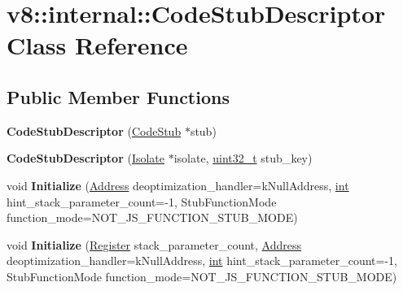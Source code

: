 \hypertarget{classv8_1_1internal_1_1CodeStubDescriptor}{}\section{v8\+:\+:internal\+:\+:Code\+Stub\+Descriptor Class Reference}
\label{classv8_1_1internal_1_1CodeStubDescriptor}
\subsection*{Public Member Functions}
\begin{DoxyCompactItemize}
\item 
\mbox{\label{classv8_1_1internal_1_1CodeStubDescriptor_a2daf19518c230bf6ca4b4434a931800d}} 
{\bfseries Code\+Stub\+Descriptor} (\mbox{\hyperlink{classv8_1_1internal_1_1CodeStub}{Code\+Stub}} $\ast$stub)
\item 
\mbox{\label{classv8_1_1internal_1_1CodeStubDescriptor_af07f54357f40df027679c9596651d586}} 
{\bfseries Code\+Stub\+Descriptor} (\mbox{\hyperlink{classv8_1_1internal_1_1Isolate}{Isolate}} $\ast$isolate, \mbox{\hyperlink{classuint32__t}{uint32\+\_\+t}} stub\+\_\+key)
\item 
\mbox{\label{classv8_1_1internal_1_1CodeStubDescriptor_ad688411c8c3330f898ddb8fc3aec1433}} 
void {\bfseries Initialize} (\mbox{\hyperlink{classuintptr__t}{Address}} deoptimization\+\_\+handler=k\+Null\+Address, \mbox{\hyperlink{classint}{int}} hint\+\_\+stack\+\_\+parameter\+\_\+count=-\/1, Stub\+Function\+Mode function\+\_\+mode=N\+O\+T\+\_\+\+J\+S\+\_\+\+F\+U\+N\+C\+T\+I\+O\+N\+\_\+\+S\+T\+U\+B\+\_\+\+M\+O\+DE)
\item 
\mbox{\label{classv8_1_1internal_1_1CodeStubDescriptor_a9a24498445b47d467dffb394535c2bed}} 
void {\bfseries Initialize} (\mbox{\hyperlink{classv8_1_1internal_1_1Register}{Register}} stack\+\_\+parameter\+\_\+count, \mbox{\hyperlink{classuintptr__t}{Address}} deoptimization\+\_\+handler=k\+Null\+Address, \mbox{\hyperlink{classint}{int}} hint\+\_\+stack\+\_\+parameter\+\_\+count=-\/1, Stub\+Function\+Mode function\+\_\+mode=N\+O\+T\+\_\+\+J\+S\+\_\+\+F\+U\+N\+C\+T\+I\+O\+N\+\_\+\+S\+T\+U\+B\+\_\+\+M\+O\+DE)

\end{DoxyCompactItemize}
